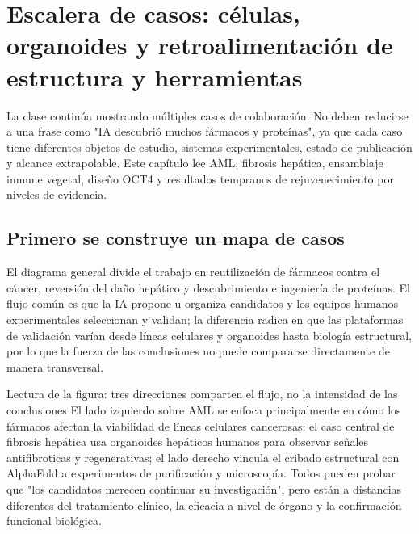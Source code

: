 \section{Escalera de casos: células, organoides y retroalimentación de estructura y herramientas}

La clase continúa mostrando múltiples casos de colaboración. No deben reducirse a una frase como "IA descubrió muchos fármacos y proteínas", ya que cada caso tiene diferentes objetos de estudio, sistemas experimentales, estado de publicación y alcance extrapolable. Este capítulo lee AML, fibrosis hepática, ensamblaje inmune vegetal, diseño OCT4 y resultados tempranos de rejuvenecimiento por niveles de evidencia.

\subsection{Primero se construye un mapa de casos}

El diagrama general divide el trabajo en reutilización de fármacos contra el cáncer, reversión del daño hepático y descubrimiento e ingeniería de proteínas. El flujo común es que la IA propone u organiza candidatos y los equipos humanos experimentales seleccionan y validan; la diferencia radica en que las plataformas de validación varían desde líneas celulares y organoides hasta biología estructural, por lo que la fuerza de las conclusiones no puede compararse directamente de manera transversal.


\begin{knowledgebox}{Lectura de la figura: tres direcciones comparten el flujo, no la intensidad de las conclusiones}
El lado izquierdo sobre AML se enfoca principalmente en cómo los fármacos afectan la viabilidad de líneas celulares cancerosas; el caso central de fibrosis hepática usa organoides hepáticos humanos para observar señales antifibroticas y regenerativas; el lado derecho vincula el cribado estructural con AlphaFold a experimentos de purificación y microscopía. Todos pueden probar que "los candidatos merecen continuar su investigación", pero están a distancias diferentes del tratamiento clínico, la eficacia a nivel de órgano y la confirmación funcional biológica.
\end{knowledgebox}

